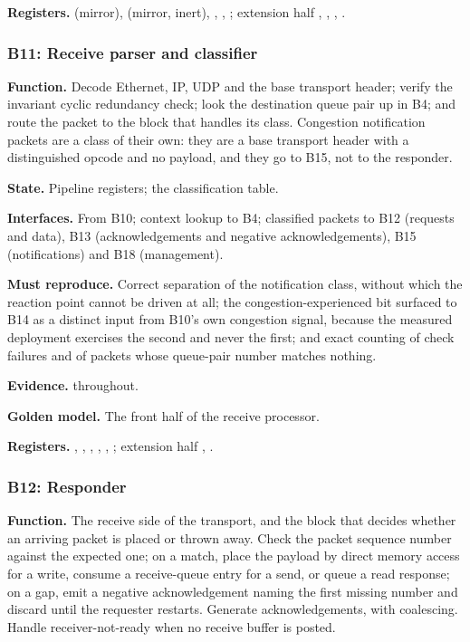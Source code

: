 {\raggedright
\textbf{Registers.}  (mirror), 
(mirror, inert), , ,
; extension half ,
, ,
.\par}

\subsubsection{B11: Receive parser and classifier}

\textbf{Function.} Decode Ethernet, IP, UDP and the base transport header;
verify the invariant cyclic redundancy check; look the destination queue pair
up in B4; and route the packet to the block that handles its class. Congestion
notification packets are a class of their own: they are a base transport header
with a distinguished opcode and no payload, and they go to B15, not to the
responder.

\textbf{State.} Pipeline registers; the classification table.

\textbf{Interfaces.} From B10; context lookup to B4; classified packets to B12
(requests and data), B13 (acknowledgements and negative acknowledgements), B15
(notifications) and B18 (management).

\textbf{Must reproduce.} Correct separation of the notification class,
without which the reaction point cannot be driven at all; the
congestion-experienced bit surfaced to B14 as a distinct input from B10's own
congestion signal, because the measured deployment exercises the second and
never the first; and exact counting of check failures and of packets whose
queue-pair number matches nothing.

\textbf{Evidence.} \evdoc{} throughout.

\textbf{Golden model.} The front half of the receive processor.

{\raggedright
\textbf{Registers.} , , ,
, , ; extension half
, .\par}

\subsubsection{B12: Responder}

\textbf{Function.} The receive side of the transport, and the block that
decides whether an arriving packet is placed or thrown away. Check the packet
sequence number against the expected one; on a match, place the payload by direct memory access
for a write, consume a receive-queue entry for a send, or queue a read
response; on a gap, emit a negative acknowledgement naming the first missing
number and discard until the requester restarts. Generate acknowledgements,
with coalescing. Handle receiver-not-ready when no receive buffer is posted.

